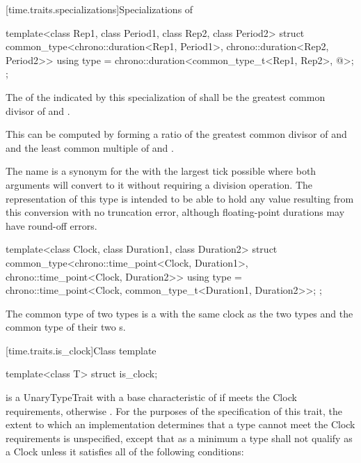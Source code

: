 [time.traits.specializations]{Specializations of }

%
\begin{itemdecl}
template<class Rep1, class Period1, class Rep2, class Period2>
struct common_type<chrono::duration<Rep1, Period1>, chrono::duration<Rep2, Period2>> {
  using type = chrono::duration<common_type_t<Rep1, Rep2>, @\seebelow@>;
};
\end{itemdecl}

\pnum
The  of the  indicated by this specialization of
 shall be the greatest common divisor of  and
. \begin{note} This can be computed by forming a ratio of the
greatest common divisor of  and  and the
least common multiple of  and .
\end{note}

\pnum
\begin{note} The  name  is a synonym for the
 with the largest tick  possible where both
 arguments will convert to it without requiring a division
operation. The representation of this type is intended to be able to hold any
value resulting from this conversion with no truncation error, although
floating-point durations may have round-off errors. \end{note}

%
\begin{itemdecl}
template<class Clock, class Duration1, class Duration2>
  struct common_type<chrono::time_point<Clock, Duration1>, chrono::time_point<Clock, Duration2>> {
    using type = chrono::time_point<Clock, common_type_t<Duration1, Duration2>>;
};
\end{itemdecl}

\pnum
The common type of two  types is a  with the same
clock as the two types and the common type of their two s.

[time.traits.is_clock]{Class template }

%
\begin{itemdecl}
template<class T> struct is_clock;
\end{itemdecl}

\pnum
{} is a UnaryTypeTrait
with a base characteristic of 
if  meets the Clock requirements,
otherwise .
For the purposes of the specification of this trait,
the extent to which an implementation determines
that a type cannot meet the Clock requirements is unspecified,
except that as a minimum
a type  shall not qualify as a Clock
unless it satisfies all of the following conditions:

